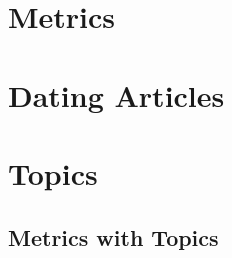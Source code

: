\documentclass[a4paper,11pt] {article}
\begin{document}
\tableofcontents
\newpage{}






\section{Metrics}\label{metrics}



\section{Dating Articles}


\section{Topics}

\subsection{Metrics with Topics}



\end{document}
